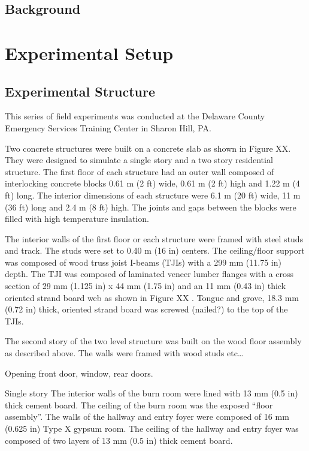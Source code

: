 \documentclass[12pt,oneside]{book}
\begin{document}
\section{Background}
\label{sec:Background}


\chapter{Experimental Setup}
\label{chap:Experimental_Setup}

\section{Experimental Structure}
\label{sec:Experimental_Structure}
This series of field experiments was conducted at the Delaware County Emergency Services Training Center in Sharon Hill, PA. 

Two concrete structures were built on a concrete slab as shown in Figure XX. They were designed to simulate a single story and a two story residential structure.  The first floor of each structure had an outer wall composed of interlocking concrete blocks 0.61 m (2 ft) wide, 0.61 m (2 ft) high and 1.22 m (4 ft) long. The interior dimensions of each structure were 6.1 m (20 ft) wide, 11 m (36 ft) long and 2.4 m (8 ft) high.  The joints and gaps between the blocks were filled with high temperature insulation.

The interior walls of the first floor or each structure were framed with steel studs and track.  The studs were set to 0.40 m (16 in) centers.  The ceiling/floor support was composed of wood truss joist I-beams (TJIs) with a 299 mm (11.75 in) depth.  The TJI was composed of laminated veneer lumber flanges with a cross section of 29 mm (1.125 in) x 44 mm (1.75 in) and an 11 mm (0.43 in) thick oriented strand board web as shown in Figure  XX .  Tongue and grove, 18.3 mm (0.72 in) thick, oriented strand board was screwed (nailed?) to the top of the TJIs.     

The second story of the two level structure was built on the wood floor assembly as described above. The walls were framed with wood studs etc…

Opening front door, window, rear doors.  

Single story  
The interior walls of the burn room were lined with 13 mm (0.5 in) thick cement board.  The ceiling of the burn room was the exposed “floor assembly”.  The walls of the hallway and entry foyer were composed of 16 mm (0.625 in) Type X gypsum room. The ceiling of the hallway and entry foyer was composed of two layers of 13 mm (0.5 in) thick cement board.    
\end{document}
